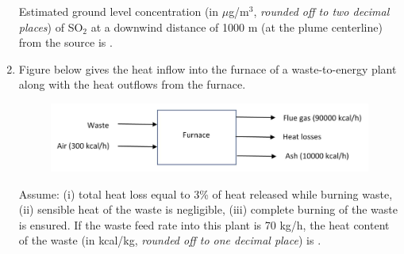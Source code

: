 \documentclass[12pt,a4paper]{article}
\begin{document}
\begin{enumerate}
   Estimated ground level concentration (in $\mu$g/m$^3$, \textit{rounded off to two decimal places}) of SO$_2$ at a downwind distance of 1000 m (at the plume centerline) from the source is \underline{\hspace{2cm}}.

   \item Figure below gives the heat inflow into the furnace of a waste-to-energy plant along with the heat outflows from the furnace.

   \begin{figure}[H]
      \centering
      \includegraphics[scale=0.4]{q65}
      \label{fig:q65}
   \end{figure}

   Assume: (i) total heat loss equal to 3\% of heat released while burning waste, (ii) sensible heat of the waste is negligible, (iii) complete burning of the waste is ensured. If the waste feed rate into this plant is 70 kg/h, the heat content of the waste (in kcal/kg, \textit{rounded off to one decimal place}) is \underline{\hspace{2cm}}.
\end{enumerate}
\end{document}
